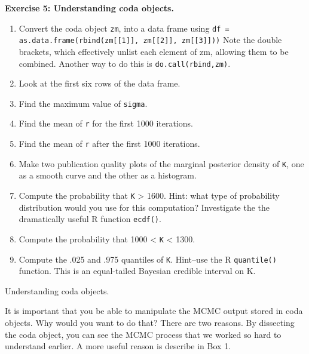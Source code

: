 \documentclass[12pt,english]{article}
\begin{document}
\belowcaptionskip=-30pt
\begin{exercise}

\begin{mdframed}
\doublespacing
\textbf{Exercise 5: Understanding coda objects.}
\begin{enumerate}
\item Convert the coda object \texttt{zm}, into a data frame using \texttt{df = as.data.frame(rbind(zm[[1]], zm[[2]], zm[[3]]))}  Note the double brackets, which effectively unlist each element of zm, allowing them to be combined. Another way to do this is \texttt{do.call(rbind,zm)}.
\item Look at the first six rows of the data frame.
\item Find the maximum value of \texttt{sigma}.
\item Find the mean of \texttt{r} for the first 1000 iterations.
\item Find the mean of \texttt{r} after the first 1000 iterations.
\item Make two publication quality plots of the marginal posterior density of \texttt{K}, one as a smooth curve and the other as a histogram.
\item Compute the probability that \texttt{K} > 1600. Hint: what type of probability distribution would you use for this computation?  Investigate the the dramatically useful R function \texttt{ecdf()}.
\item Compute the probability that 1000 < \texttt{K} < 1300.
\item Compute the .025 and .975 quantiles of \texttt{K}.  Hint--use the R \texttt{quantile()} function. This is an equal-tailed Bayesian credible interval on K.
\end{enumerate}
\end{mdframed}
\captionsetup{textformat=empty, labelformat=empty}
\caption[Understanding coda objects]{Understanding coda objects.}
\label{ex:coda understanding}
\end{exercise}
\belowcaptionskip=0pt

It is important that you be able to manipulate the MCMC output stored in coda objects. Why would you want to do that? There are two reasons. By dissecting the coda object, you can see the MCMC process that we worked so hard to understand earlier. A more useful reason is describe in Box 1.
\end{document}
